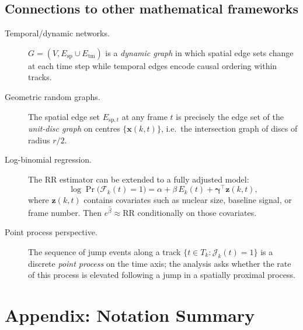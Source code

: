 \documentclass[11pt,a4paper]{article}
\theoremstyle{definition}
\theoremstyle{plain}
\newcommand{\JE}[2]{\mathcal{J}_{#1}(#2)}
\newcommand{\FJ}[2]{\mathcal{F}_{#1}(#2)}
\newcommand{\expo}[2]{E_{#1}(#2)}
\newcommand{\RR}{\mathrm{RR}}
\newcommand{\1}[1]{\mathbf{1}\!\left[#1\right]}
\begin{document}
\subsection{Connections to other mathematical frameworks}

\begin{description}
  \item[Temporal/dynamic networks.]
        $G = (V, E_{\mathrm{sp}} \cup E_{\mathrm{tm}})$ is a
        \emph{dynamic graph} in which spatial edge sets change at each
        time step while temporal edges encode causal ordering within tracks.

  \item[Geometric random graphs.]
        The spatial edge set $E_{\mathrm{sp},t}$ at any frame $t$ is
        precisely the edge set of the \emph{unit-disc graph} on centres
        $\{\bm{x}(k,t)\}$, i.e.\ the intersection graph of discs of
        radius $r/2$.

  \item[Log-binomial regression.]
        The $\RR$ estimator can be extended to a fully adjusted model:
        \[
          \log \Pr\!\bigl(\FJ{k}{t}=1\bigr)
          = \alpha + \beta\,\expo{k}{t}
            + \bm{\gamma}^\top \bm{z}(k,t),
        \]
        where $\bm{z}(k,t)$ contains covariates such as nuclear size,
        baseline signal, or frame number. Then $e^{\hat\beta} \approx \RR$
        conditionally on those covariates.

  \item[Point process perspective.]
        The sequence of jump events along a track
        $\bigl\{t \in T_k : \JE{k}{t}=1\bigr\}$ is a discrete \emph{point
        process} on the time axis; the analysis asks whether the rate of
        this process is elevated following a jump in a spatially proximal
        process.
\end{description}

\section*{Appendix: Notation Summary}
\end{document}
